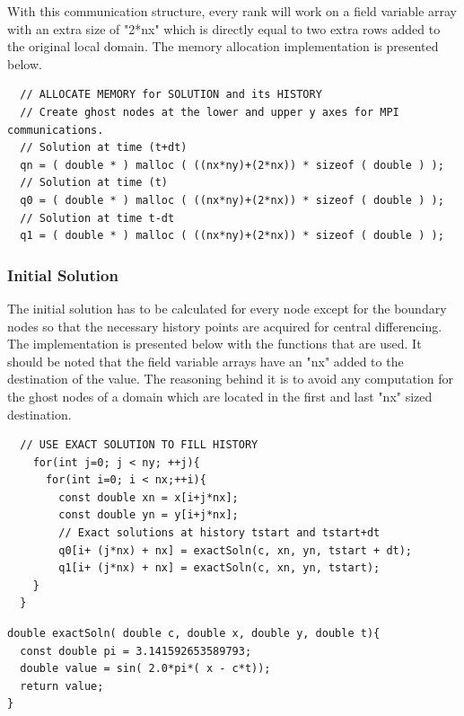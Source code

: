 \documentclass[12pt]{article}
\begin{document}
With this communication structure, every rank will work on a field variable array with an extra size of "2*nx" which is directly equal to two extra rows added to the original local domain. The memory allocation implementation is presented below.
    \begin{verbatim}
  // ALLOCATE MEMORY for SOLUTION and its HISTORY
  // Create ghost nodes at the lower and upper y axes for MPI communications.
  // Solution at time (t+dt)
  qn = ( double * ) malloc ( ((nx*ny)+(2*nx)) * sizeof ( double ) );
  // Solution at time (t)
  q0 = ( double * ) malloc ( ((nx*ny)+(2*nx)) * sizeof ( double ) );
  // Solution at time t-dt
  q1 = ( double * ) malloc ( ((nx*ny)+(2*nx)) * sizeof ( double ) );
    \end{verbatim}
\subsubsection{Initial Solution}
The initial solution has to be calculated for every node except for the boundary nodes so that the necessary history points are acquired for central differencing. The implementation is presented below with the functions that are used. It should be noted that the field variable arrays have an "nx" added to the destination of the value. The reasoning behind it is to avoid any computation for the ghost nodes of a domain which are located in the first and last "nx" sized destination.
    \begin{verbatim}
  // USE EXACT SOLUTION TO FILL HISTORY
    for(int j=0; j < ny; ++j){ 
      for(int i=0; i < nx;++i){
        const double xn = x[i+j*nx]; 
        const double yn = y[i+j*nx]; 
        // Exact solutions at history tstart and tstart+dt
        q0[i+ (j*nx) + nx] = exactSoln(c, xn, yn, tstart + dt);  
        q1[i+ (j*nx) + nx] = exactSoln(c, xn, yn, tstart);
    }
  }
    \end{verbatim}
        \begin{verbatim}
double exactSoln( double c, double x, double y, double t){
  const double pi = 3.141592653589793; 
  double value = sin( 2.0*pi*( x - c*t));
  return value;
}    \end{verbatim}
\end{document}
